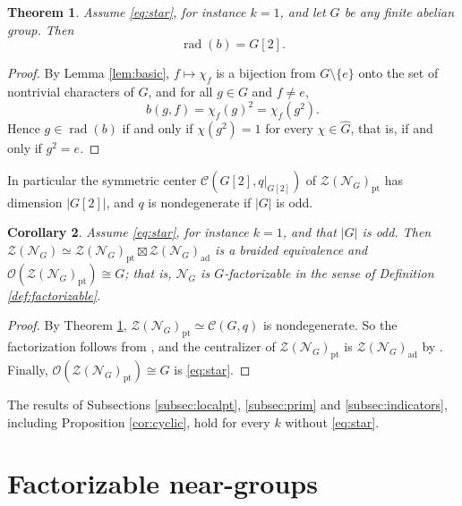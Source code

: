 \documentclass[10pt]{article}
\theoremstyle{plain}
\newtheorem{theorem}{Theorem}[section]
\newtheorem{corollary}[theorem]{Corollary}
\theoremstyle{definition}
\theoremstyle{plain}
\begin{document}
\begin{theorem}\label{thm:radical}
Assume \eqref{eq:star}, for instance $k=1$, and let $G$ be any finite abelian group.  Then
\[
  \operatorname{rad}(b)=G[2].
\]
\end{theorem}

\begin{proof}
By Lemma \ref{lem:basic}, $f\mapsto\chi_f$ is a bijection from $G\setminus\{e\}$ onto the set of nontrivial characters of $G$, and for all $g\in G$ and $f\neq e$,
\[
  b(g,f)=\chi_f(g)^{2}=\chi_f(g^{2}).
\]
Hence $g\in\operatorname{rad}(b)$ if and only if $\chi(g^{2})=1$ for every $\chi\in\widehat{G}$, that is, if and only if $g^{2}=e$.
\end{proof}

In particular the symmetric center $\mathcal{C}(G[2],q|_{G[2]})$ of $\mathcal{Z}(\mathcal{N}_G)_\mathrm{pt}$ has dimension $|G[2]|$, and $q$ is nondegenerate if $|G|$ is odd.

\begin{corollary}\label{cor:oddfactor}
    Assume \eqref{eq:star}, for instance $k=1$, and that $|G|$ is odd. Then $\mathcal{Z}(\mathcal{N}_G)\simeq\mathcal{Z}(\mathcal{N}_G)_\mathrm{pt}\boxtimes\mathcal{Z}(\mathcal{N}_G)_\mathrm{ad}$ is a braided equivalence and $\mathcal{O}(\mathcal{Z}(\mathcal{N}_G)_\mathrm{pt})\cong G$; that is, $\mathcal{N}_G$ is $G$-factorizable in the sense of Definition \ref{def:factorizable}.
\end{corollary}

\begin{proof}
    By Theorem \ref{thm:radical}, $\mathcal{Z}(\mathcal{N}_G)_\mathrm{pt}\simeq\mathcal{C}(G,q)$ is nondegenerate. So the factorization follows from \cite[Theorem 4.2]{MR1990929}, and the centralizer of $\mathcal{Z}(\mathcal{N}_G)_\mathrm{pt}$ is $\mathcal{Z}(\mathcal{N}_G)_\mathrm{ad}$ by \cite[Corollary 3.27]{MR2609644}. Finally, $\mathcal{O}(\mathcal{Z}(\mathcal{N}_G)_\mathrm{pt})\cong G$ is \eqref{eq:star}.
\end{proof}

The results of Subsections \ref{subsec:localpt}, \ref{subsec:prim} and \ref{subsec:indicators}, including Proposition \ref{cor:cyclic}, hold for every $k$ without \eqref{eq:star}.
 


\section{Factorizable near-groups}\label{sec:factorizable}
\end{document}
